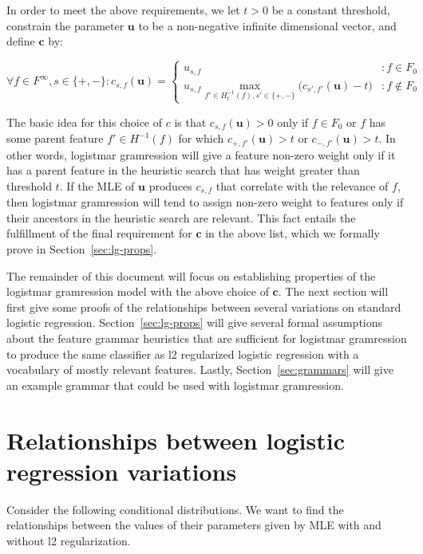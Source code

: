\documentclass[11pt,letterpaper]{article}
\begin{document}
In order to meet the above requirements, we let $t>0$ be
a constant threshold, 
constrain the parameter $\mathbf{u}$ to be a non-negative 
infinite dimensional vector,
and define $\mathbf{c}$ by:

\begin{equation}
\label{eq:c-def}
\forall f\in F^{\infty}, s\in\{+,-\}:c_{s,f}(\mathbf{u})=\left\{
     \begin{array}{lr}
	   u_{s,f} & : f\in F_0 \\  
       u_{s,f}\max_{f'\in H^{-1}_t(f),s'\in\{+,-\}}\big(c_{s',f'}(\mathbf{u})-t\big) & : f\notin F_0
     \end{array}
   \right.
\end{equation}

The basic idea for this choice of $c$ is that 
$c_{s,f}(\mathbf{u})>0$ only if $f\in F_0$ or $f$ has some  
parent feature $f'\in H^{-1}(f)$ 
for which $c_{+,f'}(\mathbf{u})>t$ or $c_{-,f'}(\mathbf{u})>t$.
In other words, logistmar gramression will give a feature non-zero
weight only if it has a parent feature in the heuristic 
search that has weight greater than threshold $t$.  If the MLE 
of $\mathbf{u}$ produces $c_{s,f}$ that correlate with
the relevance of $f$, then logistmar gramression will tend
to assign non-zero weight to features only if their ancestors
in the heuristic search are relevant.  This fact entails the 
fulfillment of the final requirement for $\mathbf{c}$ in the 
above list, which we formally prove in Section~\ref{sec:lg-props}.

The remainder of this document will focus on establishing properties of
the logistmar gramression model with the above choice of $\mathbf{c}$.  The next
section will first give some proofs of the relationships between several
variations on standard logistic regression. 
Section~\ref{sec:lg-props} 
will 
give several formal assumptions about the feature grammar
heuristics that are sufficient for
logistmar gramression to produce the same classifier as l2
regularized logistic
regression with a vocabulary of mostly relevant features.
Lastly, Section~\ref{sec:grammars} will give an 
example grammar that could be used with
logistmar gramression.

\section{Relationships between logistic regression variations}
\label{sec:lr-relationships}
Consider the following conditional distributions. We
want to find the relationships between the values of their parameters given by MLE with and
without l2 regularization.
\end{document}
